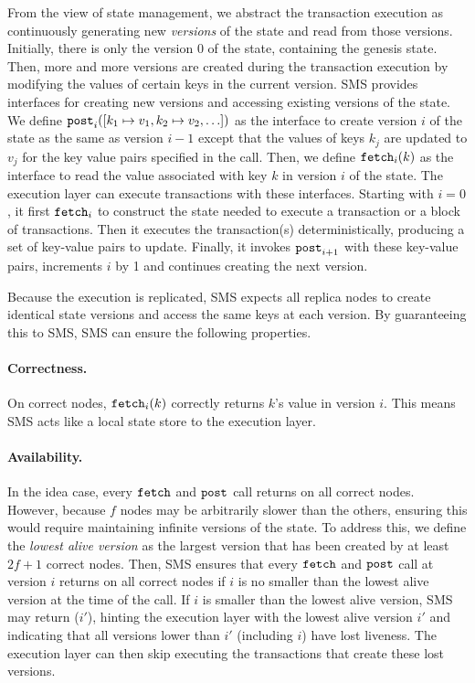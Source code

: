 From the view of state management, we abstract the transaction execution as continuously generating new \emph{versions} of the state and read from those versions.
Initially, there is only the version 0 of the state, containing the genesis state.
Then, more and more versions are created during the transaction execution by modifying the values of certain keys in the current version.
SMS provides interfaces for creating new versions and accessing existing versions of the state.
We define $\texttt{post}_{i}([k_1 \mapsto v_1, k_2 \mapsto v_2, \ldots])$ as the interface to create version $i$ of the state as the same as version $i-1$ except that the values of keys $k_j$ are updated to $v_j$ for the key value pairs specified in the call.
Then, we define $\texttt{fetch}_{i}(k)$ as the interface to read the value associated with key $k$ in version $i$ of the state.
The execution layer can execute transactions with these interfaces.
Starting with $i=0$, it first $\texttt{fetch}_{i}$ to construct the state needed to execute a transaction or a block of transactions.
Then it executes the transaction(s) deterministically, producing a set of key-value pairs to update.
Finally, it invokes $\texttt{post}_{i+1}$ with these key-value pairs, increments $i$ by 1 and continues creating the next version.

Because the execution is replicated, SMS expects all replica nodes to create identical state versions and access the same keys at each version.
By guaranteeing this to SMS, SMS can ensure the following properties.

\paragraph{Correctness.}
On correct nodes, $\texttt{fetch}_{i}(k)$ correctly returns $k$'s value in version $i$.
This means SMS acts like a local state store to the execution layer.

\paragraph{Availability.}
In the idea case, every $\texttt{fetch}$ and $\texttt{post}$ call returns on all correct nodes.
However, because $f$ nodes may be arbitrarily slower than the others, ensuring this would require maintaining infinite versions of the state.
To address this, we define the \emph{lowest alive version} as the largest version that has been created by at least $2f+1$ correct nodes.
Then, SMS ensures that every $\texttt{fetch}$ and $\texttt{post}$ call at version $i$ returns on all correct nodes if $i$ is no smaller than the lowest alive version at the time of the call.
If $i$ is smaller than the lowest alive version, SMS may return \forward($i'$), hinting the execution layer with the lowest alive version $i'$ and indicating that all versions lower than $i'$ (including $i$) have lost liveness.
The execution layer can then skip executing the transactions that create these lost versions.

